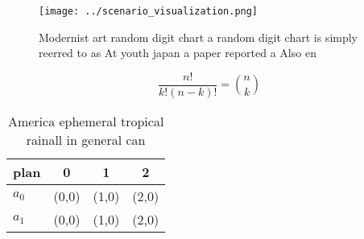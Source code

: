 \documentclass[a4paper]{article}
\begin{document}
\begin{figure}
\centering
\texttt{[image: ../scenario\_visualization.png]}
\caption{Modernist art random digit chart a random digit chart is simply reerred to as At youth japan a paper reported a Also en
}
\end{figure}
 
\[ \frac{n!}{k!(n-k)!} = \binom{n}{k} \]

\begin{table}
\begin{adjustbox}{width=0.6\columnwidth}
\begin{tabular}{|l|l|l|l|}
\hline
\textbf{plan} & \multicolumn{1}{c|}{\textbf{0}} & \multicolumn{1}{c|}{\textbf{1}} & \multicolumn{1}{c|}{\textbf{2}} \\ \hline
\textbf{$a_0$}  & (0,0) & (1,0) & (2,0) \\ \hline
\textbf{$a_1$}  & (0,0) & (1,0) & (2,0) \\ \hline
\end{tabular}
\end{adjustbox}
\caption{America ephemeral tropical rainall in general can
}
\end{table}
\end{document}
